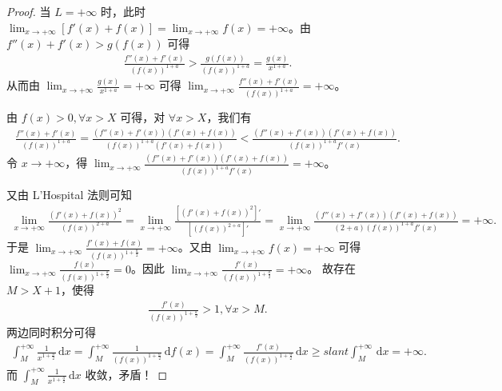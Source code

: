 \documentclass[../../main.tex]{subfiles}
\begin{document}
\begin{proof}
\two 当 \( L = +\infty \) 时，此时 \( \lim_{x \to +\infty} \left[ f'(x) + f(x) \right] = \lim_{x \to +\infty} f(x) = +\infty \)。由 \( f''(x) + f'(x) > g(f(x)) \) 可得
\begin{align*}
\frac{f''(x) + f'(x)}{\left( f(x) \right)^{1 + a}} > \frac{g(f(x))}{\left( f(x) \right)^{1 + a}} = \frac{g(x)}{x^{1 + a}}.
\end{align*}
从而由 \( \lim_{x \to +\infty} \frac{g(x)}{x^{1 + a}} = +\infty \) 可得 \( \lim_{x \to +\infty} \frac{f''(x) + f'(x)}{\left( f(x) \right)^{1 + a}} = +\infty \)。

由 \( f(x) > 0, \forall x > X \) 可得，对 \( \forall x > X \)，我们有
\begin{align*}
\frac{f''(x) + f'(x)}{\left( f(x) \right)^{1 + a}} = \frac{\left( f''(x) + f'(x) \right) \left( f'(x) + f(x) \right)}{\left( f(x) \right)^{1 + a} \left( f'(x) + f(x) \right)} < \frac{\left( f''(x) + f'(x) \right) \left( f'(x) + f(x) \right)}{\left( f(x) \right)^{1 + a} f'(x)}.
\end{align*}
令 \( x \to +\infty \)，得 \( \lim_{x \to +\infty} \frac{\left( f''(x) + f'(x) \right) \left( f'(x) + f(x) \right)}{\left( f(x) \right)^{1 + a} f'(x)} = +\infty \)。

又由 L'Hospital 法则可知
\begin{align*}
\lim_{x \to +\infty} \frac{\left( f'(x) + f(x) \right)^2}{\left( f(x) \right)^{2 + a}} = \lim_{x \to +\infty} \frac{\left[ \left( f'(x) + f(x) \right)^2 \right]'}{\left[ \left( f(x) \right)^{2 + a} \right]'} = \lim_{x \to +\infty} \frac{\left( f''(x) + f'(x) \right) \left( f'(x) + f(x) \right)}{(2 + a) \left( f(x) \right)^{1 + a} f'(x)} = +\infty.
\end{align*}
于是 \( \lim_{x \to +\infty} \frac{f'(x) + f(x)}{\left( f(x) \right)^{1 + \frac{a}{2}}} = +\infty \)。又由 \( \lim_{x \to +\infty} f(x) = +\infty \) 可得 \( \lim_{x \to +\infty} \frac{f(x)}{\left( f(x) \right)^{1 + \frac{a}{2}}} = 0 \)。因此 \( \lim_{x \to +\infty} \frac{f'(x)}{\left( f(x) \right)^{1 + \frac{a}{2}}} = +\infty \)。
故存在 \( M > X + 1 \)，使得
\begin{align*}
\frac{f'(x)}{\left( f(x) \right)^{1 + \frac{a}{2}}} > 1, \forall x > M.
\end{align*}
两边同时积分可得
\begin{align*}
\int_M^{+\infty} \frac{1}{x^{1 + \frac{a}{2}}} \, \mathrm{d}x = \int_M^{+\infty} \frac{1}{\left( f(x) \right)^{1 + \frac{a}{2}}} \, \mathrm{d}f(x) = \int_M^{+\infty} \frac{f'(x)}{\left( f(x) \right)^{1 + \frac{a}{2}}} \, \mathrm{d}x \geqslant slant  \int_M^{+\infty} \, \mathrm{d}x = +\infty.
\end{align*}
而 \( \int_M^{+\infty} \frac{1}{x^{1 + \frac{a}{2}}} \, \mathrm{d}x \) 收敛，矛盾！
\end{proof}
\end{document}
